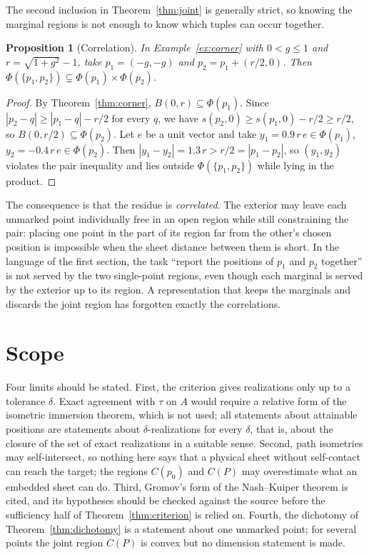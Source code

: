 \documentclass[11pt]{article}
\newtheorem{proposition}[theorem]{Proposition}
\theoremstyle{definition}
\theoremstyle{remark}
\begin{document}
The second inclusion in Theorem~\ref{thm:joint} is generally strict, so knowing the marginal regions is not enough to know which tuples can occur together.

\begin{proposition}[Correlation]\label{prop:corr}
In Example~\ref{ex:corner} with $0<g\le1$ and $r=\sqrt{1+g^2}-1$, take $p_1=(-g,-g)$ and $p_2=p_1+(r/2,0)$. Then $\Phi(\{p_1,p_2\})\subsetneq\Phi(p_1)\times\Phi(p_2)$.
\end{proposition}

\begin{proof}
By Theorem~\ref{thm:corner}, $B(0,r)\subseteq\Phi(p_1)$. Since $|p_2-q|\ge|p_1-q|-r/2$ for every $q$, we have $s(p_2,0)\ge s(p_1,0)-r/2\ge r/2$, so $B(0,r/2)\subseteq\Phi(p_2)$. Let $e$ be a unit vector and take $y_1=0.9\,r\,e\in\Phi(p_1)$, $y_2=-0.4\,r\,e\in\Phi(p_2)$. Then $|y_1-y_2|=1.3\,r>r/2=|p_1-p_2|$, so $(y_1,y_2)$ violates the pair inequality and lies outside $\Phi(\{p_1,p_2\})$ while lying in the product.
\end{proof}

The consequence is that the residue is \emph{correlated}. The exterior may leave each unmarked point individually free in an open region while still constraining the pair: placing one point in the part of its region far from the other's chosen position is impossible when the sheet distance between them is short. In the language of the first section, the task ``report the positions of $p_1$ and $p_2$ together'' is not served by the two single-point regions, even though each marginal is served by the exterior up to its region. A representation that keeps the marginals and discards the joint region has forgotten exactly the correlations.

\section{Scope}

Four limits should be stated. First, the criterion gives realizations only up to a tolerance $\delta$. Exact agreement with $\tau$ on $A$ would require a relative form of the isometric immersion theorem, which is not used; all statements about attainable positions are statements about $\delta$-realizations for every $\delta$, that is, about the closure of the set of exact realizations in a suitable sense. Second, path isometries may self-intersect, so nothing here says that a physical sheet without self-contact can reach the target; the regions $C(p_0)$ and $C(P)$ may overestimate what an embedded sheet can do. Third, Gromov's form of the Nash--Kuiper theorem is cited, and its hypotheses should be checked against the source before the sufficiency half of Theorem~\ref{thm:criterion} is relied on. Fourth, the dichotomy of Theorem~\ref{thm:dichotomy} is a statement about one unmarked point; for several points the joint region $C(P)$ is convex but no dimension statement is made.
\end{document}
